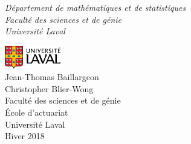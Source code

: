 \begin{titlepage}
	\vspace{0.5\baselineskip} %
	
	\textit{Département de mathématiques et de statistiques\\Faculté des sciences et de génie\\Université Laval} %
	
	\vfill %
	
	
        
        \includegraphics[height=1cm]{UL_P.pdf}\\
        Jean-Thomas Baillargeon\\
        Christopher Blier-Wong\\
        Faculté des sciences et de génie\\
        École d'actuariat\\
        Université Laval\\
        Hiver 2018       
\end{titlepage}
